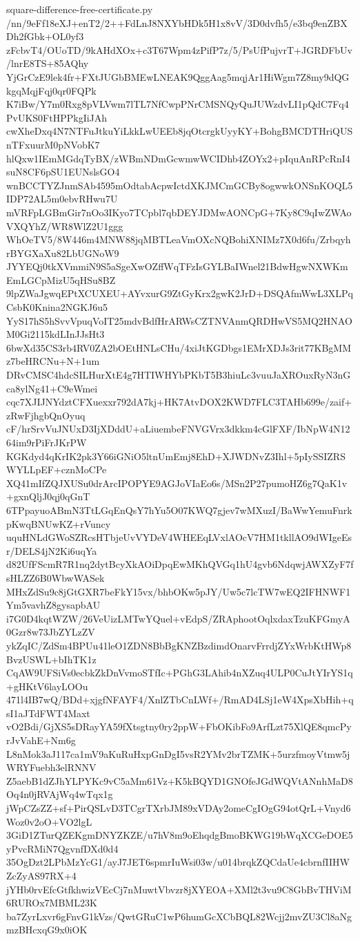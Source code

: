 \documentclass[11pt]{article}
\theoremstyle{definition}
\theoremstyle{remark}
\begin{document}
\begin{filecontents*}[overwrite]{square-difference-free-certificate.py}
/nn/9eFf18eXJ+enT2/2++FdLnJ8NXYbHDk5H1x8vV/3D0dvfh5/e3bq9enZBXDh2fGbk+OL0yf3
zFcbvT4/OUoTD/9kAHdXOx+c3T67Wpm4zPifP7z/5/PsUfPujvrT+JGRDFbUv/lnrE8TS+85AQhy
YjGrCzE9lek4fr+FXtJUGbBMEwLNEAK9QggAag5mqjAr1HiWgm7Z8my9dQGkgqMqjFqj0qr0FQPk
K7iBw/Y7m0Rxg8pVLVwm7lTL7NfCwpPNrCMSNQyQuJUWzdvLI1pQdC7Fq4PvUKS0FtHPPkgIiJAh
cwXheDxq4N7NTFuJtkuYiLkkLwUEEb8jqOtcrgkUyyKY+BohgBMCDTHriQUSnTFxuurM0pNVobK7
hlQxw1IEmMGdqTyBX/zWBmNDmGcwmwWCIDhb4ZOYx2+pIquAnRPcRnI4suN8CF6pSU1EUNslsGO4
wnBCCTYZJnmSAb4595mOdtabAcpwIctdXKJMCmGCBy8ogwwkONSnKOQL5IDP72AL5m0ebvRHwu7U
mVRFpLGBmGir7nOo3IKyo7TCpbl7qbDEYJDMwAONCpG+7Ky8C9qIwZWAoVXQYhZ/WR8WlZ2U1ggg
WhOeTV5/8W446m4MNW88jqMBTLeaVmOXcNQBohiXNIMz7X0d6fu/ZrbqyhrBYGXaXu82LbUGNoW9
JYYEQj0tkXVmmiN9S5aSgeXwOZffWqTFzIsGYLBaIWnel21BdwHgwNXWKmEmLGCpMizU5qHSu8BZ
9lpZWaJgwqEPtXCUXEU+AYvxurG9ZtGyKrx2gwK2JrD+DSQAfmWwL3XLPqCsbK0Knina2NGKJ6u5
YyS17hS5hSvvVpuqVoIT25mdvBdfHrARWsCZTNVAnmQRDHwVS5MQ2HNAOM0Gi2115kdLInJJsHt3
6bwXd35CS3rb4RV0ZA2bOEtHNLsCHu/4xiJtKGDbgs1EMrXDJs3rit77KBgMMz7beHRCNu+N+1um
DRvCMSC4hdcSILHurXtE4g7HTIWHYbPKbT5B3hiuLc3vuuJaXROuxRyN3nGca8ylNg41+C9eWmei
cqc7XJIJNYdztCFXuexxr792dA7kj+HK7AtvDOX2KWD7FLC3TAHb699e/zaif+zRwFjhgbQnOyuq
cF/hrSrvVuJNUxD3IjXDddU+aLiuembeFNVGVrx3dkkm4cGlFXF/IbNpW4N1264im9rPiFrJKrPW
KGKdyd4qKrIK2pk3Y66iGNiO5ltnUmEmj8EhD+XJWDNvZ3Ihl+5pIySSIZRSWYLLpEF+cznMoCPe
XQ41mIfZQJXUSu0drArcIPOPYE9AGJoVIaEo6s/MSn2P27pumoHZ6g7QaK1v+gxnQljJ0qj0qGnT
6TPpayuoABmN3TtLGqEnQsY7hYu5O07KWQ7gjev7wMXuzI/BaWwYemuFnrkpKwqBNUwKZ+rVuncy
uquHNLdGWoSZRcsHTbjeUvVYDeV4WHEEqLVxlAOcV7HM1tkllAO9dWIgeEsr/DELS4jN2Ki6uqYa
d82UfFScmR7R1nq2dytBcyXkAOiDpqEwMKhQVGq1hU4gvb6NdqwjAWXZyF7fsHLZZ6B0WbwWASek
MHxZdSu9c8jGtGXR7beFkY15vx/bhbOKw5pJY/Uw5c7lcTW7wEQ2IFHNWF1Ym5vavhZ8gysapbAU
i7G0D4kqtWZW/26VeUizLMTwYQuel+vEdpS/ZRAphootOqlxdaxTzuKFGmyA0Gzr8w73JbZYLzZV
ykZqIC/ZdSm4BPUu41leO1ZDN8BbBgKNZBzdimdOnarvFrrdjZYxWrbKtHWp8BvzUSWL+bIhTK1z
CqAW9UFSiVs0ecbkZkDnVvmoSTfIc+PGhG3LAhib4nXZuq4ULP0CuJtYIrYS1q+gHKtV6layLOOu
471l4IB7wQ/BDd+xjgfNFAYF4/XnlZTbCnLWf+/RmAD4LSj1eW4XpsXbHih+qsI1aJTdFWT4Maxt
vO2Bdi/GjXS5sDRayYA59fXtsgtny0ry2ppW+FbOKibFo9ArfLzt75XlQE8qmcPyrJvVahE+Nm6g
L8nMok3aJ117ca1mV9aKuRuHxpGnDgI5vsR2YMv2brTZMK+5urzfmoyVtmw5jWRYFuebh3elRNNV
Z5aebB1dZJhYLPYKc9vC5aMm61Vz+K5kBQYD1GNOfeJGdWQVtANnhMaD8Oq4n0jRVAjWq4wTqx1g
jWpCZsZZ+sf+PirQSLvD3TCgrTXrbJM89xVDAy2omeCgIOgG94otQrL+Vnyd6Woz0v2oO+VO2lgL
3GiD1ZTurQZEKgmDNYZKZE/u7hV8m9oEhqdgBmoBKWG19bWqXCGeDOE5yPvcRMiN7QgvnfDXd0d4
35OgDzt2LPbMzYcG1/ayJ7JET6spmrIuWsi03w/u014brqkZQCdaUe4cbrnfIIHWZcZyAS97RX+4
jYHb0rvEfcGtfkhwizVEcCj7nMuwtVbvzr8jXYEOA+XMl2t3vu9C8GbBvTHViM6RUROx7MBML23K
ba7ZyrLxvr6gFnvG1kVzs/QwtGRuC1wP6humGcXCbBQL82Wcjj2mvZU3Cl8aNgmzBHcxqG9x0iOK

\end{filecontents*}
\end{document}
